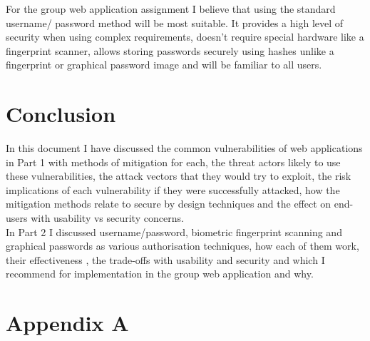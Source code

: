 \documentclass{ueacmpstyle}
\begin{document}
    For the group web application assignment I believe that using the standard username/
    password method will be most suitable. It provides a high level of security when using 
    complex requirements, doesn't require special hardware like a fingerprint scanner, allows 
    storing passwords securely using hashes unlike a fingerprint or graphical password image 
    and will be familiar to all users. 

    \section{Conclusion}\label{sec:Con}
    In this document I have discussed the common vulnerabilities of web applications in Part 1 
    with methods of mitigation for each, the threat actors likely to use these vulnerabilities, the attack 
    vectors that they would try to exploit, the risk implications of each vulnerability if 
    they were successfully attacked, how the mitigation methods relate to secure by design 
    techniques and the effect on end-users with usability vs security concerns.
    \\
    In Part 2 I discussed username/password, biometric fingerprint scanning and graphical 
    passwords as various authorisation techniques, how each of them work, their effectiveness 
    , the trade-offs with usability and security and which I recommend for implementation in 
    the group web application and why.
    
    

  \newpage

	
	
	\newpage
	
	\appendix
        \section{Appendix A}\label{app:A}   %
\end{document}
